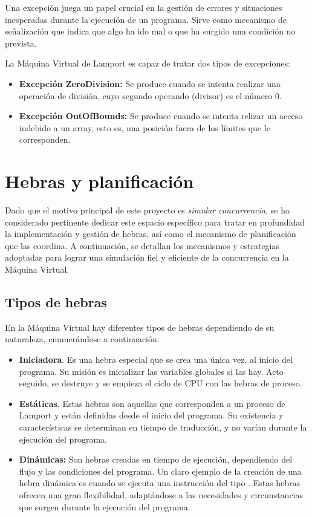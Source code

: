 Una excepción juega un papel crucial en la gestión de errores y situaciones inesperadas durante la ejecución de un programa. Sirve como mecanismo de señalización que indica que algo ha ido mal o que ha surgido una condición no prevista.


\noindent
La Máquina Virtual de Lamport es capaz de tratar dos tipos de excepciones:
\begin{itemize}
    \item \textbf{Excepción ZeroDivision:} Se produce cuando se intenta realizar una operación de división, cuyo segundo operando (divisor) es el número 0.
    \item \textbf{Excepción OutOfBounds:} Se produce cuando se intenta relizar un acceso indebido a un array, esto es, una posición fuera de los límites que le corresponden.
\end{itemize}

\section{Hebras y planificación}
Dado que el motivo principal de este proyecto es \textit{simular concurrencia}, se ha considerado pertinente dedicar este espacio específico para tratar en profundidad la implementación y gestión de hebras, así como el mecanismo de planificación que las coordina. A continuación, se detallan los mecanismos y estrategias adoptadas para lograr una simulación fiel y eficiente de la concurrencia en la Máquina Virtual.

\subsection{Tipos de hebras}
En la Máquina Virtual hay diferentes tipos de hebras dependiendo de su naturaleza, enumerándose a continuación:

\begin{itemize}
    \item \textbf{Iniciadora}. Es una hebra especial que se crea una única vez, al inicio del programa. Su misión es inicializar las variables globales si las hay. Acto seguido, se destruye y se empieza el ciclo de CPU con las hebras de proceso.
    \item \textbf{Estáticas}. Estas hebras son aquellas que corresponden a un proceso de Lamport y están definidas desde el inicio del programa. Su existencia y características se determinan en tiempo de traducción, y no varían durante la ejecución del programa.
    \item \textbf{Dinámicas:} Son hebras creadas en tiempo de ejecución, dependiendo del flujo y las condiciones del programa. Un claro ejemplo de la creación de una hebra dinámica es cuando se ejecuta una instrucción del tipo . Estas hebras ofrecen una gran flexibilidad, adaptándose a las necesidades y circunstancias que surgen durante la ejecución del programa.
\end{itemize}


